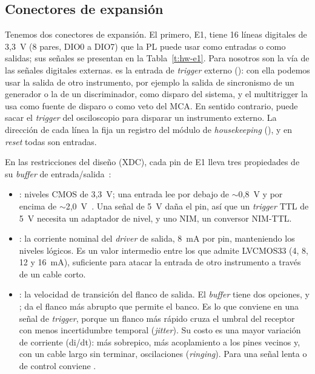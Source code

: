 \subsection{Conectores de expansión}
\label{S:hw-conectores}

Tenemos dos conectores de expansión. El primero, E1, tiene 16 líneas digitales
de 3,3~V (8 pares, DIO0 a DIO7) que la PL puede usar como entradas o como
salidas; sus señales se presentan en la Tabla~\ref{t:hw-e1}. Para nosotros son
la vía de las señales digitales externas.  es la entrada de
\emph{trigger} externo (): con ella podemos usar la salida de otro
instrumento, por ejemplo la salida de sincronismo de un generador o la de un
discriminador, como disparo del sistema, y el multitrigger la usa como fuente de
disparo o como veto del MCA. En sentido contrario,  puede sacar
el \emph{trigger} del osciloscopio para disparar un instrumento externo. La dirección
de cada línea la fija un registro del módulo de \emph{housekeeping}
(), y en \emph{reset} todas son entradas.

En las restricciones del diseño (XDC), cada pin de E1 lleva tres propiedades de
su \emph{buffer} de entrada/salida~\cite{UG471}:
\begin{itemize}
  \item {}: niveles CMOS de 3,3~V; una entrada lee
     por debajo de $\sim$0,8~V y  por encima de
    $\sim$2,0~V~\cite{DS187}. Una señal de 5~V daña el pin, así que un \emph{trigger}
    TTL de 5~V necesita un adaptador de nivel, y uno NIM, un conversor NIM-TTL.
  \item {}: la corriente nominal del \emph{driver} de salida, 8~mA por
    pin, manteniendo los niveles lógicos. Es un valor intermedio entre los que
    admite LVCMOS33 (4, 8, 12 y 16~mA), suficiente para atacar la entrada de
    otro instrumento a través de un cable corto.
  \item {}: la velocidad de transición del flanco de salida. El
    \emph{buffer} tiene dos opciones,  y ;  da
    el flanco más abrupto que permite el banco. Es lo que conviene en una señal
    de \emph{trigger}, porque un flanco más rápido cruza el umbral del receptor con
    menos incertidumbre temporal (\emph{jitter}). Su costo es una mayor
    variación de corriente (di/dt): más sobrepico, más acoplamiento a los pines
    vecinos y, con un cable largo sin terminar, oscilaciones (\emph{ringing}).
    Para una señal lenta o de control conviene .
\end{itemize}

